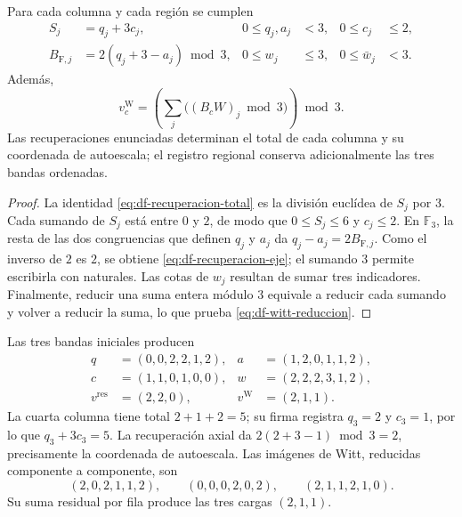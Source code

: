 \begin{theorem}
\label{thm:df-recuperacion-firma}
Para cada columna y cada región se cumplen
\begin{align}
 S_j&=q_j+3c_j,&0\leq q_j,a_j&<3,&0\leq c_j&\leq2,
 \label{eq:df-recuperacion-total}\\
 B_{\mathrm F,j}&=2(q_j+3-a_j)\bmod3,&0\leq w_j&\leq3,
 &0\leq\bar w_j&<3.
 \label{eq:df-recuperacion-eje}
\end{align}
Además,
\begin{equation}
 v_c^{\mathrm W}
 =\left(\sum_j\bigl((B_cW)_j\bmod3\bigr)\right)\bmod3.
 \label{eq:df-witt-reduccion}
\end{equation}
Las recuperaciones enunciadas determinan el total de cada columna y su
coordenada de autoescala; el registro regional conserva adicionalmente
las tres bandas ordenadas.
\end{theorem}

\begin{proof}
La identidad \eqref{eq:df-recuperacion-total} es la división euclídea de
\(S_j\) por \(3\). Cada sumando de \(S_j\) está entre \(0\) y \(2\),
de modo que \(0\leq S_j\leq6\) y \(c_j\leq2\). En \(\mathbb F_3\),
la resta de las dos congruencias que definen \(q_j\) y \(a_j\) da
\(q_j-a_j=2B_{\mathrm F,j}\). Como el inverso de \(2\) es \(2\), se
obtiene \eqref{eq:df-recuperacion-eje}; el sumando \(3\) permite
escribirla con naturales. Las cotas de \(w_j\) resultan de sumar tres
indicadores. Finalmente, reducir una suma entera módulo \(3\) equivale
a reducir cada sumando y volver a reducir la suma, lo que prueba
\eqref{eq:df-witt-reduccion}.
\end{proof}

\begin{example}
Las tres bandas iniciales producen
\begin{align*}
 q&=(0,0,2,2,1,2),&a&=(1,2,0,1,1,2),\\
 c&=(1,1,0,1,0,0),&w&=(2,2,2,3,1,2),\\
 v^{\mathrm{res}}&=(2,2,0),&v^{\mathrm W}&=(2,1,1).
\end{align*}
La cuarta columna tiene total \(2+1+2=5\); su firma registra
\(q_3=2\) y \(c_3=1\), por lo que \(q_3+3c_3=5\).
La recuperación axial da
\(2(2+3-1)\bmod3=2\), precisamente la coordenada de autoescala.
Las imágenes de Witt, reducidas componente a componente, son
\[
 (2,0,2,1,1,2),\qquad
 (0,0,0,2,0,2),\qquad
 (2,1,1,2,1,0).
\]
Su suma residual por fila produce las tres cargas \((2,1,1)\).
\end{example}

